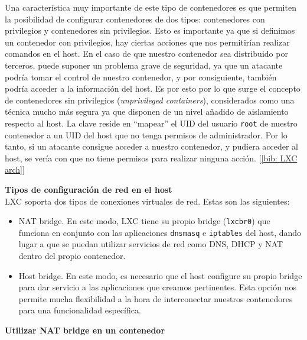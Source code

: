 \documentclass[a4paper, oneside, 12pt]{book}
\begin{document}
	\noindent Una característica muy importante de este tipo de contenedores es que permiten la posibilidad de configurar contenedores de dos tipos: contenedores con privilegios y contenedores sin privilegios. Esto es importante ya que si definimos un contenedor con privilegios, hay ciertas acciones que nos permitirían realizar comandos en el host. En el caso de que nuestro contenedor sea distribuido por terceros, puede suponer un problema grave de seguridad, ya que un atacante podría tomar el control de nuestro contenedor, y por consiguiente, también podría acceder a la información del host. Es por esto por lo que surge el concepto de contenedores sin privilegios (\textit{unprivileged containers}), considerados como una técnica mucho más segura ya que disponen de un nivel añadido de aislamiento respecto al host. La clave reside en ``mapear'' el UID del usuario \texttt{root} de nuestro contenedor a un UID del host que no tenga permisos de administrador. Por lo tanto, si un atacante consigue acceder a nuestro contenedor, y pudiera acceder al host, se vería con que no tiene permisos para realizar ninguna acción. [\ref{bib: LXC arch}]
	
	\pagebreak
	
	\noindent \textbf{\large Tipos de configuración de red en el host}\\
	
	\noindent LXC soporta dos tipos de conexiones virtuales de red. Estas son las siguientes: 
	\begin{itemize}
		\item NAT bridge. En este modo, LXC tiene su propio bridge (\texttt{lxcbr0}) que funciona en conjunto con las aplicaciones \texttt{dnsmasq} e \texttt{iptables} del host, dando lugar a que se puedan utilizar servicios de red como DNS, DHCP y NAT dentro del propio contenedor.
		\item Host bridge. En este modo, es necesario que el host configure su propio bridge para dar servicio a las aplicaciones que creamos pertinentes. Esta opción nos permite mucha flexibilidad a la hora de interconectar nuestros contenedores para una funcionalidad específica.
	\end{itemize}


	\vspace{20px}

	\noindent \textbf{\large Utilizar NAT bridge en un contenedor}\\
\end{document}
